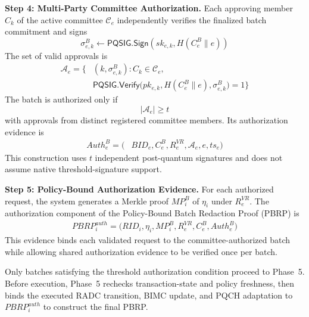 \documentclass[lettersize,journal]{IEEEtran}
\begin{document}
\medskip
\noindent\textbf{Step 4: Multi-Party Committee
Authorization.}
Each approving member $C_k$ of the active
committee $\mathcal{C}_e$ independently verifies
the finalized batch commitment and signs
\begin{equation}
\sigma_{e,k}^{B}
\leftarrow
\mathsf{PQSIG.Sign}
\left(
sk_{e,k},
H(C_e^{B}\parallel e)
\right)
\end{equation}
The set of valid approvals is
\begin{equation}
\begin{aligned}
\mathcal{A}_e=\big\{&
(k,\sigma_{e,k}^{B}): C_k\in\mathcal{C}_e,\\
&\mathsf{PQSIG.Verify}\big(
pk_{e,k},
H(C_e^{B}\parallel e),
\sigma_{e,k}^{B}\big)=1
\big\}
\end{aligned}
\end{equation}
The batch is authorized only if
\begin{equation}
|\mathcal{A}_e|\geq t
\end{equation}
with approvals from distinct registered
committee members. Its authorization
evidence is
\begin{equation}
\begin{aligned}
Auth_e^{B}=\big(
&BID_e,C_e^{B},R_e^{VR},\mathcal{A}_e,e,ts_e\big)
\end{aligned}
\end{equation}
This construction uses $t$ independent
post-quantum signatures and does not
assume native threshold-signature support.

\medskip
\noindent\textbf{Step 5: Policy-Bound
Authorization Evidence.}
For each authorized request, the system
generates a Merkle proof $MP_i^{B}$ of
$\eta_i$ under $R_e^{VR}$. The authorization
component of the Policy-Bound Batch
Redaction Proof (PBRP) is
\begin{equation}
\begin{aligned}
PBRP_i^{auth}=\big(
RID_i,\eta_i,MP_i^{B},R_e^{VR},C_e^{B},Auth_e^{B}\big)
\end{aligned}
\end{equation}
This evidence binds each validated request
to the committee-authorized batch while
allowing shared authorization evidence
to be verified once per batch.

Only batches satisfying the threshold
authorization condition proceed to Phase~5.
Before execution, Phase~5 rechecks
transaction-state and policy freshness,
then binds the executed RADC transition,
BIMC update, and PQCH adaptation to
$PBRP_i^{auth}$ to construct the final PBRP.
\end{document}
